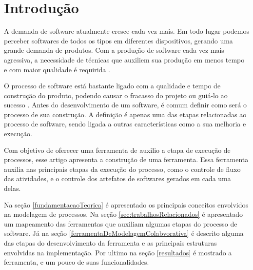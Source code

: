 \section{Introdução}\label{introducao}
A demanda de software atualmente cresce cada vez mais. Em todo lugar podemos perceber softwares de todos os tipos em diferentes dispositivos, gerando uma grande demanda de produtos. Com a produção de software cada vez mais agressiva, a necessidade de técnicas que auxiliem sua produção em menos tempo e com maior qualidade é requirida \cite{larman2007utilizando}.

O processo de software está bastante ligado com a qualidade e tempo de construção do produto, podendo causar o fracasso do projeto ou guiá-lo ao sucesso \cite{sommerville2007engenharia}.  Antes do desenvolvimento de um software, é comum definir como será o processo de sua construção. A definição é apenas uma das etapas relacionadas ao processo de software, sendo ligada a outras características como a sua melhoria e execução.

Com objetivo de oferecer uma ferramenta de auxilio a etapa de execução de processos, esse artigo apresenta a construção de uma ferramenta. Essa ferramenta auxilia nas principais etapas da execução do processo, como o controle de fluxo das atividades, e o controle dos artefatos de softwares gerados em cada uma delas.

Na seção \ref{fundamentacaoTeorica} é apresentado os principais conceitos envolvidos na modelagem de processos. Na seção \ref{sec:trabalhosRelacionados} é apresentado um mapeamento das ferramentas que auxiliam algumas etapas do processo de software. Já na seção \ref{ferramentaDeModelagemColabvorativa} é descrito alguma das etapas do desenvolvimento da ferramenta e as principais estruturas envolvidas na implementação. Por ultimo na seção \ref{resultados} é mostrado a ferramenta, e um pouco de suas funcionalidades.